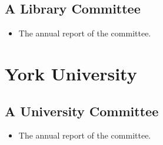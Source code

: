 \documentclass[12pt,oneside]{book}
\begin{document}
\subsection{A Library Committee}

\begin{itemize}
  \item The annual report of the committee.
\end{itemize}



\section{York University}

\subsection{A University Committee}

\begin{itemize}
  \item The annual report of the committee.
\end{itemize}


\end{document}
